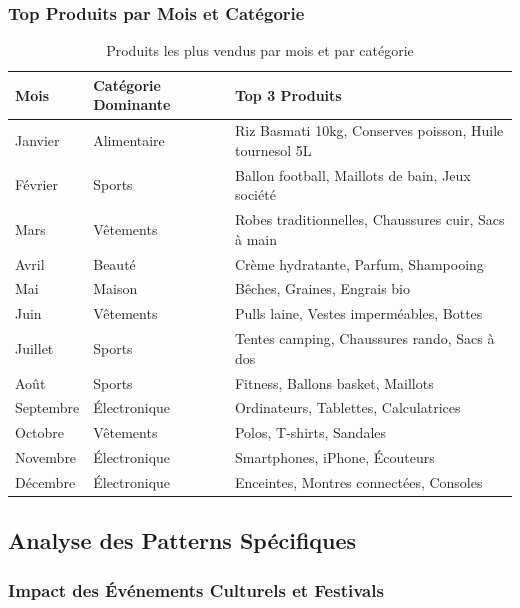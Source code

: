 \documentclass[a4paper,12pt]{article}
\begin{document}
\subsubsection{Top Produits par Mois et Catégorie}

\begin{longtable}{|l|l|p{8cm}|}
\caption{Produits les plus vendus par mois et par catégorie}
\label{tab:produits_par_mois} \\
\hline
\textbf{Mois} & \textbf{Catégorie Dominante} & \textbf{Top 3 Produits} \\ \hline
Janvier & Alimentaire & Riz Basmati 10kg, Conserves poisson, Huile tournesol 5L \\ \hline
Février & Sports & Ballon football, Maillots de bain, Jeux société \\ \hline
Mars & Vêtements & Robes traditionnelles, Chaussures cuir, Sacs à main \\ \hline
Avril & Beauté & Crème hydratante, Parfum, Shampooing \\ \hline
Mai & Maison & Bêches, Graines, Engrais bio \\ \hline
Juin & Vêtements & Pulls laine, Vestes imperméables, Bottes \\ \hline
Juillet & Sports & Tentes camping, Chaussures rando, Sacs à dos \\ \hline
Août & Sports & Fitness, Ballons basket, Maillots \\ \hline
Septembre & Électronique & Ordinateurs, Tablettes, Calculatrices \\ \hline
Octobre & Vêtements & Polos, T-shirts, Sandales \\ \hline
Novembre & Électronique & Smartphones, iPhone, Écouteurs \\ \hline
Décembre & Électronique & Enceintes, Montres connectées, Consoles \\ \hline
\end{longtable}

\subsection{Analyse des Patterns Spécifiques}

\subsubsection{Impact des Événements Culturels et Festivals}
\end{document}
